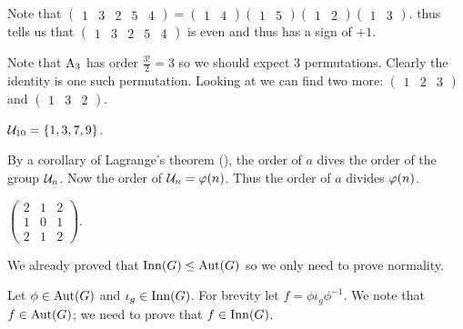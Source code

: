 \begin{questions}
    \item Note that $\begin{pmatrix}1&3&2&5&4\end{pmatrix} = \begin{pmatrix}1&4\end{pmatrix}\begin{pmatrix}1&5\end{pmatrix}\begin{pmatrix}1&2\end{pmatrix}\begin{pmatrix}1&3\end{pmatrix}$.  thus tells us that $\begin{pmatrix}1&3&2&5&4\end{pmatrix}$ is even and thus has a sign of $+1$.

    \item Note that $\mathrm{A}_{3}$ has order $\frac{3!}{2} = 3$ so we should expect 3 permutations. Clearly the identity is one such permutation. Looking at  we can find two more: $\begin{pmatrix}1&2&3\end{pmatrix}$ and $\begin{pmatrix}1&3&2\end{pmatrix}$.

    \item $\mathcal{U}_{10} = \{1, 3, 7, 9\}$.

    \item By a corollary of Lagrange's theorem (), the order of $a$ dives the order of the group $\mathcal{U}_{n}$. Now the order of $\mathcal{U}_{n} = \varphi(n)$. Thus the order of $a$ divides $\varphi(n)$.

    \item $\begin{pmatrix}2&1&2\\1&0&1\\2&1&2\end{pmatrix}$.

    \item We already proved that $\mathrm{Inn}(G) \leq \mathrm{Aut}(G)$ so we only need to prove normality.

    Let $\phi \in \mathrm{Aut}(G)$ and $\iota_g \in \mathrm{Inn}(G)$. For brevity let $f = \phi\iota_g\phi^{-1}$. We note that $f \in \mathrm{Aut}(G)$; we need to prove that $f \in \mathrm{Inn}(G)$.


\end{questions}
